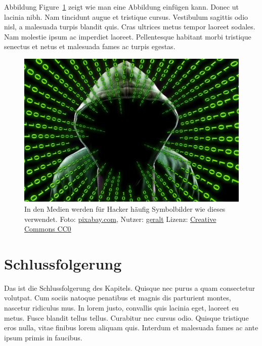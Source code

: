 \documentclass[listof=totoc,index=totoc,bibliography=totoc,12pt,german,a4paper,]{report}
\begin{document}
Abbildung Figure~\ref{fig:my_fig} zeigt wie man eine Abbildung einfügen
kann. Donec ut lacinia nibh. Nam tincidunt augue et tristique cursus.
Vestibulum sagittis odio nisl, a malesuada turpis blandit quis. Cras
ultrices metus tempor laoreet sodales. Nam molestie ipsum ac imperdiet
laoreet. Pellentesque habitant morbi tristique senectus et netus et
malesuada fames ac turpis egestas.

\begin{figure}
\hypertarget{fig:my_fig}{%
\centering
\includegraphics[width=1\textwidth,height=\textheight]{source/figures/beispielbild.jpg}
\caption[Figure short caption]{In den Medien werden für Hacker häufig
Symbolbilder wie dieses verwendet. Foto:
\href{https://pixabay.com/photo-2883632/}{pixabay.com}, Nutzer:
\href{https://pixabay.com/de/users/geralt-9301/}{geralt} Lizenz:
\href{https://creativecommons.org/publicdomain/zero/1.0/deed.de}{Creative
Commons CC0} \label{mein_label}}\label{fig:my_fig}
}
\end{figure}

\section{Schlussfolgerung}\label{schlussfolgerung-1}

Das ist die Schlussfolgerung des Kapitels. Quisque nec purus a quam
consectetur volutpat. Cum sociis natoque penatibus et magnis dis
parturient montes, nascetur ridiculus mus. In lorem justo, convallis
quis lacinia eget, laoreet eu metus. Fusce blandit tellus tellus.
Curabitur nec cursus odio. Quisque tristique eros nulla, vitae finibus
lorem aliquam quis. Interdum et malesuada fames ac ante ipsum primis in
faucibus.
\end{document}
